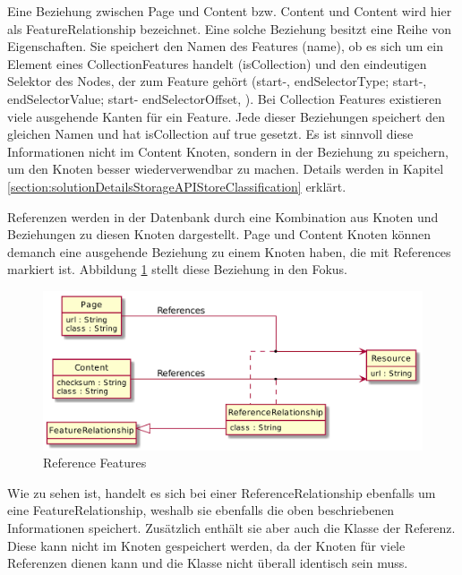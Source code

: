     Eine Beziehung zwischen Page und Content bzw. Content und Content
    wird hier als FeatureRelationship bezeichnet.
    Eine solche Beziehung besitzt eine Reihe von Eigenschaften.
    Sie speichert den Namen des Features (name),
    ob es sich um ein Element eines CollectionFeatures handelt (isCollection)
    und den eindeutigen Selektor des Nodes, der zum Feature gehört
    (start-, endSelectorType; start-, endSelectorValue; start- endSelectorOffset, ).
    Bei Collection Features existieren viele ausgehende Kanten für ein Feature.
    Jede dieser Beziehungen speichert den gleichen Namen und hat isCollection auf true gesetzt.
    Es ist sinnvoll diese Informationen nicht im Content Knoten, sondern in der Beziehung zu speichern,
    um den Knoten besser wiederverwendbar zu machen.
    Details werden in Kapitel \ref{section:solutionDetailsStorageAPIStoreClassification} erklärt.

    Referenzen werden in der Datenbank durch eine Kombination aus
    {\resource} Knoten und Beziehungen zu diesen Knoten dargestellt.
    Page und Content Knoten können demanch eine ausgehende Beziehung zu einem
    {\resource} Knoten haben, die mit References markiert ist.
    Abbildung \ref{image:dbDataModelResourceRelationship} stellt diese Beziehung in den Fokus.

    \begin{figure}
        \centering
        \includegraphics[width=\textwidth]{../resources/db-data-model/resource-relationship.png}
        \caption{Reference Features}
        \label{image:dbDataModelResourceRelationship}
    \end{figure}

    Wie zu sehen ist, handelt es sich bei einer ReferenceRelationship ebenfalls
    um eine FeatureRelationship, weshalb sie ebenfalls die oben beschriebenen Informationen speichert.
    Zusätzlich enthält sie aber auch die Klasse der Referenz.
    Diese kann nicht im {\resource} Knoten gespeichert werden,
    da der Knoten für viele Referenzen dienen kann und die Klasse nicht überall identisch sein muss.